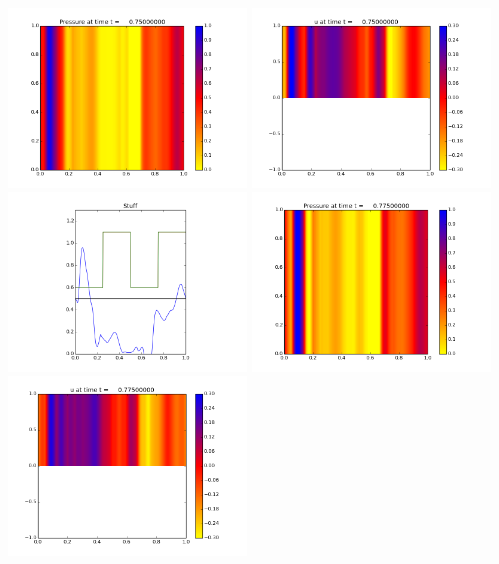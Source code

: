\documentclass[11pt]{article}
\begin{document}
\vskip 10pt 
\includegraphics[width=0.475\textwidth]{frame0030fig0.png}
\includegraphics[width=0.475\textwidth]{frame0030fig1.png}
\vskip 10pt 
\includegraphics[width=0.475\textwidth]{frame0030fig3.png}
\vskip 10pt 
\includegraphics[width=0.475\textwidth]{frame0031fig0.png}
\includegraphics[width=0.475\textwidth]{frame0031fig1.png}
\end{document}
